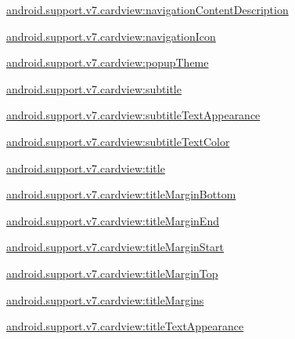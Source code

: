 {\ttfamily \hyperlink{classandroid_1_1support_1_1v7_1_1cardview_1_1R_1_1styleable_a1530a92c6708dc96b49416ed9e722bc5}{android.\+support.\+v7.\+cardview\+:navigation\+Content\+Description}}

{\ttfamily \hyperlink{classandroid_1_1support_1_1v7_1_1cardview_1_1R_1_1styleable_af69916d5ccab7224ea96ec17a90ccc6a}{android.\+support.\+v7.\+cardview\+:navigation\+Icon}}

{\ttfamily \hyperlink{classandroid_1_1support_1_1v7_1_1cardview_1_1R_1_1styleable_a8d28e7c348452dd4d2e1736a96d0e624}{android.\+support.\+v7.\+cardview\+:popup\+Theme}}

{\ttfamily \hyperlink{classandroid_1_1support_1_1v7_1_1cardview_1_1R_1_1styleable_a15786fa791e3f7056cf296b7dc084793}{android.\+support.\+v7.\+cardview\+:subtitle}}

{\ttfamily \hyperlink{classandroid_1_1support_1_1v7_1_1cardview_1_1R_1_1styleable_aa11a7434ed1156d4cb5332750e4d47d7}{android.\+support.\+v7.\+cardview\+:subtitle\+Text\+Appearance}}

{\ttfamily \hyperlink{classandroid_1_1support_1_1v7_1_1cardview_1_1R_1_1styleable_a666ac2e125d2da2c2f5914e8752d53c5}{android.\+support.\+v7.\+cardview\+:subtitle\+Text\+Color}}

{\ttfamily \hyperlink{classandroid_1_1support_1_1v7_1_1cardview_1_1R_1_1styleable_a8a1e899ea860ef6abef71ec802396325}{android.\+support.\+v7.\+cardview\+:title}}

{\ttfamily \hyperlink{classandroid_1_1support_1_1v7_1_1cardview_1_1R_1_1styleable_ad223c3ae470aaccab0964ae1eab151d8}{android.\+support.\+v7.\+cardview\+:title\+Margin\+Bottom}}

{\ttfamily \hyperlink{classandroid_1_1support_1_1v7_1_1cardview_1_1R_1_1styleable_a8f2cddb87416872d939a7d1b70b3756d}{android.\+support.\+v7.\+cardview\+:title\+Margin\+End}}

{\ttfamily \hyperlink{classandroid_1_1support_1_1v7_1_1cardview_1_1R_1_1styleable_ab25420371f54701b5a8cf6d7a885519b}{android.\+support.\+v7.\+cardview\+:title\+Margin\+Start}}

{\ttfamily \hyperlink{classandroid_1_1support_1_1v7_1_1cardview_1_1R_1_1styleable_ad27fec87a488036b64111605f95749ac}{android.\+support.\+v7.\+cardview\+:title\+Margin\+Top}}

{\ttfamily \hyperlink{classandroid_1_1support_1_1v7_1_1cardview_1_1R_1_1styleable_ae38a718516abd89948a47ede4fa58b9f}{android.\+support.\+v7.\+cardview\+:title\+Margins}}

{\ttfamily \hyperlink{classandroid_1_1support_1_1v7_1_1cardview_1_1R_1_1styleable_a0550b9c219eb26f50afa2d0709195a54}{android.\+support.\+v7.\+cardview\+:title\+Text\+Appearance}}


